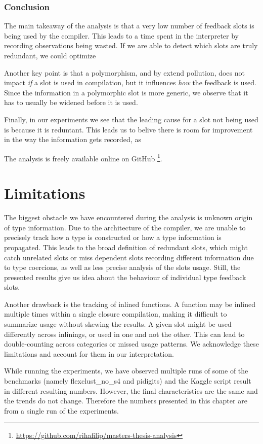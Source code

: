 \subsubsection*{Conclusion}

The main takeaway of the analysis is that a very low number of feedback slots is being used by the compiler. This leads to a time spent in the interpreter by recording observations being wasted. If we are able to detect which slots are truly redundant, we could optimize

Another key point is that a polymorphism, and by extend pollution, does not impact \textit{if} a slot is used in compilation, but it influences \textit{how} the feedback is used. Since the information in a polymorphic slot is more generic, we observe that it has to usually be widened before it is used.

Finally, in our experiments we see that the leading cause for a slot not being used is because it is reduntant. This leads us to belive there is room for improvement in the way the information gets recorded, as

The analysis is freely available online on GitHub \footnote{\url{https://github.com/rihafilip/masters-thesis-analysis}}.

\section{Limitations}

The biggest obstacle we have encountered during the analysis is unknown origin of type information. Due to the architecture of the compiler, we are unable to precisely track how a type is constructed or how a type information is propagated. This leads to the broad definition of redundant slots, which might catch unrelated slots or miss dependent slots recording different information due to type coercions, as well as less precise analysis of the slots usage. Still, the presented results give us idea about the behaviour of individual type feedback slots.

Another drawback is the tracking of inlined functions. A function may be inlined multiple times within a single closure compilation, making it difficult to summarize usage without skewing the results. A given slot might be used differently across inlinings, or used in one and not the other. This can lead to double-counting across categories or missed usage patterns. We acknowledge these limitations and account for them in our interpretation.

While running the experiments, we have observed multiple runs of some of the benchmarks (namely flexclust\_no\_s4 and pidigits) and the Kaggle script result in different resulting numbers. However, the final characteristics are the same and the trends do not change. Therefore the numbers presented in this chapter are from a single run of the experiments.

